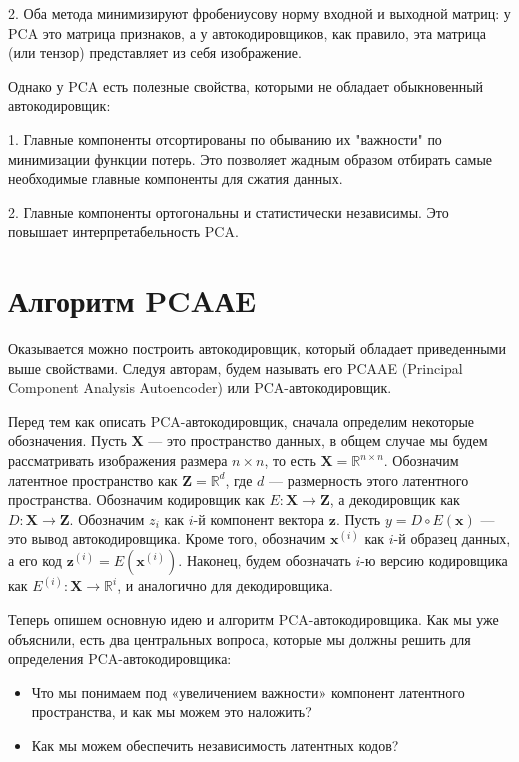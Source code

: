 2. Оба метода минимизируют фробениусову норму входной и выходной матриц: у PCA это матрица признаков, а у автокодировщиков, как правило, эта матрица (или тензор) представляет из себя изображение.

Однако у PCA есть полезные свойства, которыми не обладает обыкновенный автокодировщик:

1. Главные компоненты отсортированы по обыванию их "важности" по минимизации функции потерь. Это позволяет жадным образом отбирать самые необходимые главные компоненты для сжатия данных.

2. Главные компоненты ортогональны и статистически независимы. Это повышает интерпретабельность PCA.



\section{Алгоритм PCAАE}

Оказывается можно построить автокодировщик, который обладает приведенными выше свойствами. Следуя авторам, будем называть его PCAAE (Principal Component Analysis Autoencoder) или PCA-автокодировщик.

Перед тем как описать PCA-автокодировщик, сначала определим некоторые обозначения. Пусть \( \mathbf{X} \) — это пространство данных, в общем случае мы будем рассматривать изображения размера \( n \times n \), то есть \( \mathbf{X} = \mathbb{R}^{n \times n} \). Обозначим латентное пространство как \( \mathbf{Z} = \mathbb{R}^d \), где \( d \) — размерность этого латентного пространства. Обозначим кодировщик как \( E: \mathbf{X} \to \mathbf{Z} \), а декодировщик как \( D: \mathbf{X} \to \mathbf{Z} \). Обозначим \( z_i \) как \( i \)-й компонент вектора \( \mathbf{z} \). Пусть \( y = D \circ E(\mathbf{x}) \) — это вывод автокодировщика. Кроме того, обозначим \( \mathbf{x}^{(i)} \) как \( i \)-й образец данных, а его код \( \mathbf{z}^{(i)} = E(\mathbf{x}^{(i)}) \). Наконец, будем обозначать \( i \)-ю версию кодировщика как \( E^{(i)}: \mathbf{X} \to \mathbb{R}^i \), и аналогично для декодировщика.

Теперь опишем основную идею и алгоритм PCA-автокодировщика. Как мы уже объяснили, есть два центральных вопроса, которые мы должны решить для определения PCA-автокодировщика:
\begin{itemize}
    \item Что мы понимаем под «увеличением важности» компонент латентного пространства, и как мы можем это наложить?
    \item Как мы можем обеспечить независимость латентных кодов?
\end{itemize}

